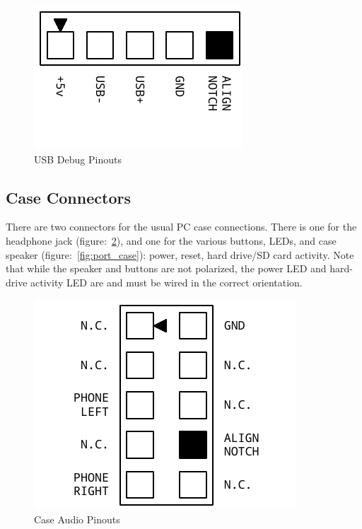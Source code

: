\begin{figure}[ht]
    \begin{center}
        \includegraphics[scale=0.75]{images/f256_port_usb.pdf}
    \end{center}
    \caption{USB Debug Pinouts}
    \label{fig:port_usb}
\end{figure}

\subsection*{Case Connectors}

There are two connectors for the usual PC case connections. There is one for the headphone jack (figure:~\ref{fig:port_audio}), and one for the various buttons, LEDs, and case speaker (figure:~\ref{fig:port_case}): power, reset, hard drive/SD card activity. Note that while the speaker and buttons are not polarized, the power LED and hard-drive activity LED are and must be wired in the correct orientation.

\begin{figure}[ht]
    \begin{center}
        \includegraphics[scale=0.75]{images/f256_port_audio.pdf}
    \end{center}
    \caption{Case Audio Pinouts}
    \label{fig:port_audio}
\end{figure}

